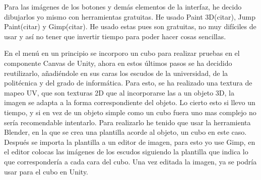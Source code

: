 Para las imágenes de los botones y demás elementos de la interfaz, he decido dibujarlos yo mismo con herramientas gratuitas. He usado Paint 3D(citar), Jump Paint(citar) y Gimp(citar). He usado estas pues son gratuitas, no muy difíciles de usar y así no tener que invertir tiempo para poder hacer cosas sencillas.



En el menú en un principio se incorporo un cubo para realizar pruebas en el componente Canvas de Unity, ahora en estos últimos pasos se ha decidido reutilizarlo, añadiéndole en sus caras los escudos de la universidad, de la politécnica y del grado de informática. Para esto, se ha realizado una textura de mapeo UV, que son texturas 2D que al incorporarse las a un objeto 3D, la imagen se adapta a la forma correspondiente del objeto. Lo cierto esto si llevo un tiempo, y si en vez de un objeto simple como un cubo fuera uno mas complejo no sería recomendable intentarlo. Para realizarlo he tenido que usar la herramienta Blender, en la que se crea una plantilla acorde al objeto, un cubo en este caso. Después se importa la plantilla a un editor de imagen, para esto yo use Gimp, en el editor colocas las imágenes de los escudos siguiendo la plantilla que indica lo que correspondería a cada cara del cubo. Una vez editada la imagen, ya se podría usar para el cubo en Unity.

